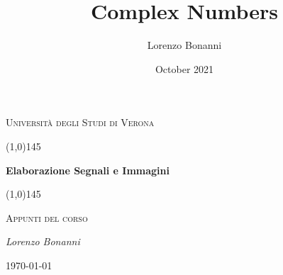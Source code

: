 \documentclass{article}
\title{Complex Numbers}
\author{Lorenzo Bonanni}
\date{October 2021}
\begin{document}
    \clearpage

    \begin{titlepage}
       \centering
       \vspace*{\fill}
       {\scshape\LARGE Università degli Studi di Verona \par}
       \vspace{1.5cm}
       \line(1,0){145} \\
       {\huge\bfseries Elaborazione Segnali e Immagini\par}
       \line(1,0){145} \\
       \vspace{0.5cm}
       {\scshape\Large Appunti del corso\par}
       \vspace{2cm}
       {\Large\itshape Lorenzo Bonanni \par}
       \vspace{1cm}

       \vspace{5cm}
       \vspace*{\fill}
       {\large \today\par}
    \end{titlepage}
    \thispagestyle{empty}

    \tableofcontents

    
    
\end{document}
